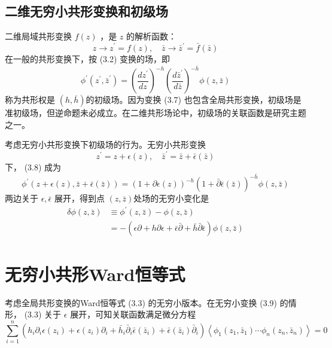 \subsection{二维无穷小共形变换和初级场}

二维局域共形变换 $f(z)$ ，是 $z$ 的解析函数：
\begin{equation}
	z \rightarrow z^{\prime}=f(z), \quad \bar{z} \rightarrow \bar{z}^{\prime}=\bar{f}(\bar{z})
\end{equation}
在一般的共形变换下，按 (3.2) 变换的场，即
\begin{equation}
\phi^{\prime}\left(z^{\prime}, \bar{z}^{\prime}\right)=\left(\frac{d z^{\prime}}{d z}\right)^{-h}\left(\frac{d \bar{z}^{\prime}}{d \bar{z}}\right)^{-\bar{h}} \phi(z, \bar{z})
\end{equation}
称为共形权是 $(h,\bar{h}) $的初级场。因为变换 (3.7) 也包含全局共形变换，初级场是准初级场，但逆命题未必成立。在二维共形场论中，初级场的关联函数是研究主题之一。

考虑无穷小共形变换下初级场的行为。无穷小共形变换
\begin{equation}
z^{\prime}=z+\epsilon(z), \quad \bar{z}^{\prime}=\bar{z}+\bar{\epsilon}(\bar{z})
\end{equation}
下， (3.8) 成为
\begin{equation}
\phi^{\prime}(z+\epsilon(z), \bar{z}+\bar{\epsilon}(\bar{z}))=(1+\partial \epsilon(z))^{-h}(1+\bar{\partial} \bar{\epsilon}(\bar{z}))^{-\bar{h}} \phi(z, \bar{z})
\end{equation}
两边关于 $\epsilon,\bar{\epsilon}$ 展开，得到点 $(z,\bar{z}) $处场的无穷小变化是
\begin{equation}
\begin{aligned} \delta \phi(z, \bar{z}) & \equiv \phi^{\prime}(z, \bar{z})-\phi(z, \bar{z}) \\ &=-(\epsilon \partial+h \partial \epsilon+\bar{\epsilon} \bar{\partial}+\bar{h} \bar{\partial} \bar{\epsilon}) \phi(z, \bar{z}) \end{aligned}
\end{equation}

\section{无穷小共形Ward恒等式}

考虑全局共形变换的Ward恒等式 (3.3) 的无穷小版本。在无穷小变换 (3.9) 的情形， (3.3) 关于 $\epsilon$ 展开，可知关联函数满足微分方程
\begin{equation}
\sum_{i=1}^{n}\left(h_{i} \partial_{i} \epsilon\left(z_{i}\right)+\epsilon\left(z_{i}\right) \partial_{i}+\bar{h}_{i} \bar{\partial}_{i} \bar{\epsilon}\left(\bar{z}_{i}\right)+\bar{\epsilon}\left(\bar{z}_{i}\right) \bar{\partial}_{i}\right)\left\langle\phi_{1}\left(z_{1}, \bar{z}_{1}\right) \cdots \phi_{n}\left(z_{n}, \bar{z}_{n}\right)\right\rangle=0
\end{equation}

